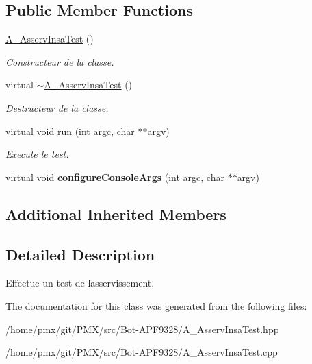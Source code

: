 \subsection*{Public Member Functions}
\begin{DoxyCompactItemize}
\item 
\mbox{\label{classA__AsservInsaTest_ad9747262f4a8313a7fb22c1283b098b9}} 
\hyperlink{classA__AsservInsaTest_ad9747262f4a8313a7fb22c1283b098b9}{A\+\_\+\+Asserv\+Insa\+Test} ()
\begin{DoxyCompactList}\small\item\em Constructeur de la classe. \end{DoxyCompactList}\item 
\mbox{\label{classA__AsservInsaTest_af9d93af9fb7c03c6fef82b0eae5b902e}} 
virtual \hyperlink{classA__AsservInsaTest_af9d93af9fb7c03c6fef82b0eae5b902e}{$\sim$\+A\+\_\+\+Asserv\+Insa\+Test} ()
\begin{DoxyCompactList}\small\item\em Destructeur de la classe. \end{DoxyCompactList}\item 
\mbox{\label{classA__AsservInsaTest_aecdab7eb1a270927321e01a00f5faa12}} 
virtual void \hyperlink{classA__AsservInsaTest_aecdab7eb1a270927321e01a00f5faa12}{run} (int argc, char $\ast$$\ast$argv)
\begin{DoxyCompactList}\small\item\em Execute le test. \end{DoxyCompactList}\item 
\mbox{\label{classA__AsservInsaTest_a70fc769b62545da45e4c05be77331972}} 
virtual void {\bfseries configure\+Console\+Args} (int argc, char $\ast$$\ast$argv)
\end{DoxyCompactItemize}
\subsection*{Additional Inherited Members}


\subsection{Detailed Description}
Effectue un test de l\textquotesingle{}asservissement. 

The documentation for this class was generated from the following files\+:\begin{DoxyCompactItemize}
\item 
/home/pmx/git/\+P\+M\+X/src/\+Bot-\/\+A\+P\+F9328/A\+\_\+\+Asserv\+Insa\+Test.\+hpp\item 
/home/pmx/git/\+P\+M\+X/src/\+Bot-\/\+A\+P\+F9328/A\+\_\+\+Asserv\+Insa\+Test.\+cpp\end{DoxyCompactItemize}
